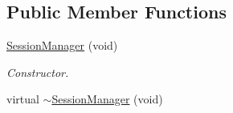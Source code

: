 \subsection*{Public Member Functions}
\begin{DoxyCompactItemize}
\item 
\hypertarget{class_session_manager_aaf49f6f3c3ee0fe9dc24fc31c043f548}{\hyperlink{class_session_manager_aaf49f6f3c3ee0fe9dc24fc31c043f548}{Session\-Manager} (void)}\label{class_session_manager_aaf49f6f3c3ee0fe9dc24fc31c043f548}

\begin{DoxyCompactList}\small\item\em Constructor. \end{DoxyCompactList}\item 
\hypertarget{class_session_manager_ab92f318df1eeb77c505a1540ff83af79}{virtual \hyperlink{class_session_manager_ab92f318df1eeb77c505a1540ff83af79}{$\sim$\-Session\-Manager} (void)}\label{class_session_manager_ab92f318df1eeb77c505a1540ff83af79}


\end{DoxyCompactItemize}
